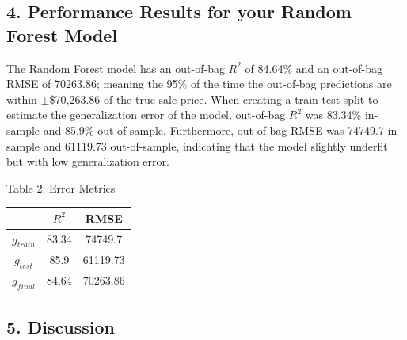 \documentclass[12pt]{article}
\begin{document}
\subsection*{4. Performance Results for your Random Forest Model}

The Random Forest model has an out-of-bag $R^2$ of 84.64\% and an out-of-bag RMSE of 70263.86; meaning the 95\% of the time the out-of-bag predictions are within $\pm$\$70,263.86 of  the true sale price. When creating a train-test split to estimate the generalization error of the model, out-of-bag $R^2$ was 83.34\% in-sample and 85.9\% out-of-sample. Furthermore, out-of-bag RMSE was 74749.7 in-sample and 61119.73 out-of-sample, indicating that the model slightly underfit but with low generalization error.

\begin{center}
Table 2: Error Metrics \\
\begin{tabular} {|c|c|c|} 
\hline
& $R^2$ & RMSE \\
\hline
$g_{train}$ & 83.34 & 74749.7 \\
$g_{test}$ & 85.9 & 61119.73 \\
$g_{final}$ & 84.64 & 70263.86 \\
\hline
\end{tabular}
\end{center}




\subsection*{5. Discussion}

\end{document}
